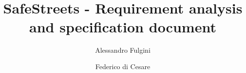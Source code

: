 \documentclass[draft=false]{scrreprt}
\title{SafeStreets - Requirement analysis and specification document}
\author{Alessandro Fulgini \and Federico di Cesare}
\begin{document}
  \begin{titlepage}
    
  \end{titlepage}
  

  \tableofcontents

  
  
\end{document}
